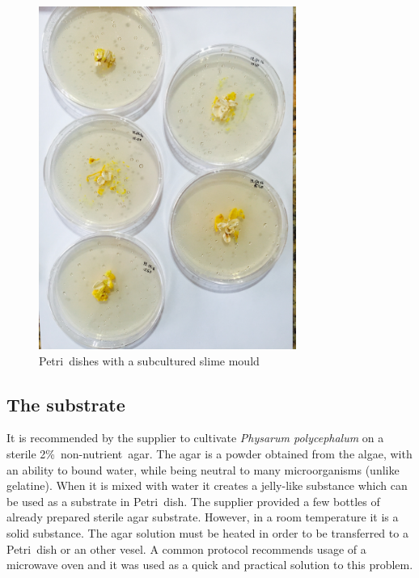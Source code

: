 \documentclass[english,a4paper,twoside]{ppfcmthesis}
\begin{document}
\begin{figure}
  \centering

  \includegraphics[width=0.75\textwidth]{figures/physarum/IMG_1175.jpg}

  \caption{Petri~dishes with a subcultured slime mould}
  \label{figure:p_multiple_petri}
\end{figure}


\subsection*{The substrate}

It is recommended by the supplier to cultivate \textit{Physarum polycephalum} on a sterile 2\%~non-nutrient~agar. The agar is a powder obtained from the algae, with an ability to bound water, while being neutral to many microorganisms (unlike gelatine). When it is mixed with water it creates a jelly-like substance which can be used as a substrate in Petri~dish. The supplier provided a few bottles of already prepared sterile agar substrate. However, in a room temperature it is a solid substance. The agar solution must be heated in order to be transferred to a Petri~dish or an other vesel. A common protocol recommends usage of a microwave oven \cite{hanson1978microwave} and it was used as a quick and practical solution to this problem.
\end{document}
